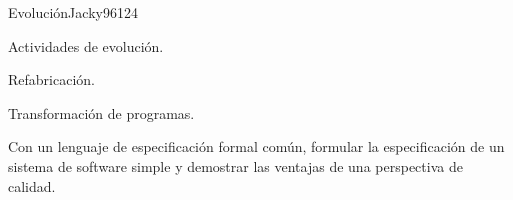 \begin{syllabus}
\begin{unit}{Evolución}{Jacky96}{12}{4}
   \begin{topics}
      \item Actividades de evolución.
      \begin{inparaenum}
         \item Refabricación.
         \item Transformación de programas.
      \end{inparaenum}
   \end{topics}
   \begin{unitgoals}
      \item Con un lenguaje de especificación formal común, formular la especificación de un sistema de software simple y demostrar las ventajas de una perspectiva de calidad.
   \end{unitgoals}
\end{unit}



\begin{coursebibliography}
\end{coursebibliography}

\end{syllabus}
